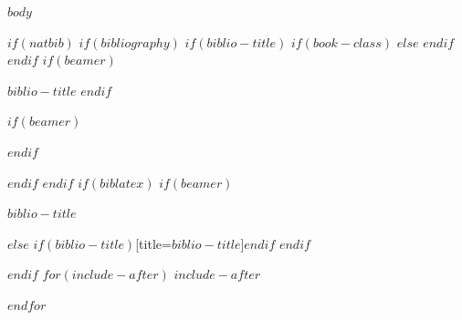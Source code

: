 \documentclass[$if(fontsize)$$fontsize$,$endif$$if(lang)$$babel-lang$,$endif$$if(papersize)$$papersize$paper,$endif$$if(beamer)$ignorenonframetext,$if(handout)$handout,$endif$$if(aspectratio)$aspectratio=$aspectratio$,$endif$$endif$$for(classoption)$$classoption$$sep$,$endfor$]{$documentclass$}
\newif\ifbibliography
\begin{document}
$body$

$if(natbib)$
$if(bibliography)$
$if(biblio-title)$
$if(book-class)$
\renewcommand\bibname{$biblio-title$}
$else$
\renewcommand\refname{$biblio-title$}
$endif$
$endif$
$if(beamer)$
\begin{frame}[allowframebreaks]{$biblio-title$}
\bibliographytrue
$endif$

$if(beamer)$
\end{frame}
$endif$

$endif$
$endif$
$if(biblatex)$
$if(beamer)$
\begin{frame}[allowframebreaks]{$biblio-title$}
\bibliographytrue
\printbibliography[heading=none]
\end{frame}
$else$
\printbibliography$if(biblio-title)$[title=$biblio-title$]$endif$
$endif$

$endif$
$for(include-after)$
$include-after$

$endfor$
\end{document}
